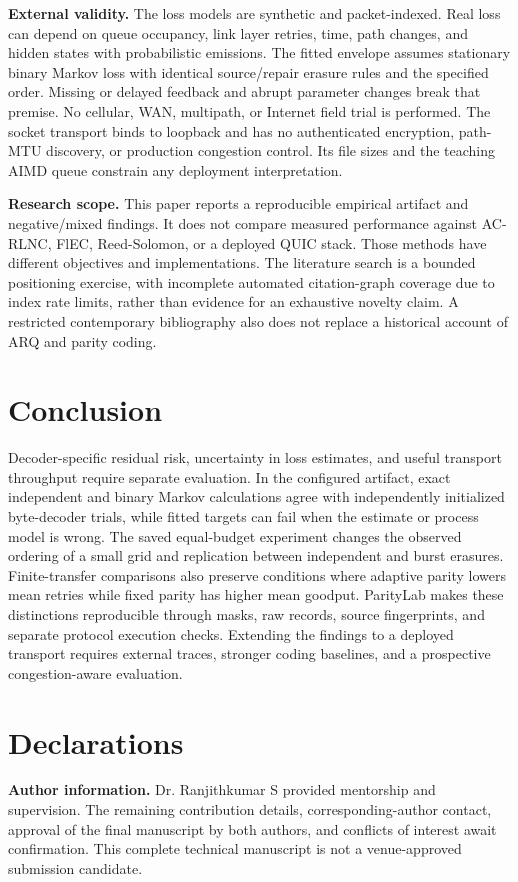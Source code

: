 \documentclass[11pt,a4paper]{article}
\begin{document}
\textbf{External validity.} The loss models are synthetic and packet-indexed. Real loss can depend on queue occupancy, link layer retries, time, path changes, and hidden states with probabilistic emissions. The fitted envelope assumes stationary binary Markov loss with identical source/repair erasure rules and the specified order. Missing or delayed feedback and abrupt parameter changes break that premise. No cellular, WAN, multipath, or Internet field trial is performed. The socket transport binds to loopback and has no authenticated encryption, path-MTU discovery, or production congestion control. Its file sizes and the teaching AIMD queue constrain any deployment interpretation.

\textbf{Research scope.} This paper reports a reproducible empirical artifact and negative/mixed findings. It does not compare measured performance against AC-RLNC, FlEC, Reed-Solomon, or a deployed QUIC stack. Those methods have different objectives and implementations. The literature search is a bounded positioning exercise, with incomplete automated citation-graph coverage due to index rate limits, rather than evidence for an exhaustive novelty claim. A restricted contemporary bibliography also does not replace a historical account of ARQ and parity coding.

\section{Conclusion}
Decoder-specific residual risk, uncertainty in loss estimates, and useful transport throughput require separate evaluation. In the configured artifact, exact independent and binary Markov calculations agree with independently initialized byte-decoder trials, while fitted targets can fail when the estimate or process model is wrong. The saved equal-budget experiment changes the observed ordering of a small grid and replication between independent and burst erasures. Finite-transfer comparisons also preserve conditions where adaptive parity lowers mean retries while fixed parity has higher mean goodput. ParityLab makes these distinctions reproducible through masks, raw records, source fingerprints, and separate protocol execution checks. Extending the findings to a deployed transport requires external traces, stronger coding baselines, and a prospective congestion-aware evaluation.

\section*{Declarations}
\textbf{Author information.} Dr. Ranjithkumar S provided mentorship and supervision. The remaining contribution details, corresponding-author contact, approval of the final manuscript by both authors, and conflicts of interest await confirmation. This complete technical manuscript is not a venue-approved submission candidate.
\end{document}
